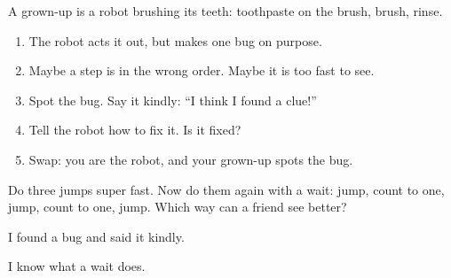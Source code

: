 
\begin{playathome}
A grown-up is a robot brushing its teeth: toothpaste on the brush, brush, rinse.
\begin{enumerate}[leftmargin=1.4em,itemsep=2pt]
  \item The robot acts it out, but makes one bug on purpose.
  \item Maybe a step is in the wrong order. Maybe it is too fast to see.
  \item Spot the bug. Say it kindly: \enquote{I think I found a clue!}
  \item Tell the robot how to fix it. Is it fixed?
  \item Swap: you are the robot, and your grown-up spots the bug.
\end{enumerate}
\end{playathome}

\begin{playathome}
Do three jumps super fast. Now do them again with a wait: jump, count to one, jump, count to one, jump. Which way can a friend see better?
\end{playathome}

\begin{selfcheck}
  \item I found a bug and said it kindly.
  \item I know what a wait does.
\end{selfcheck}

